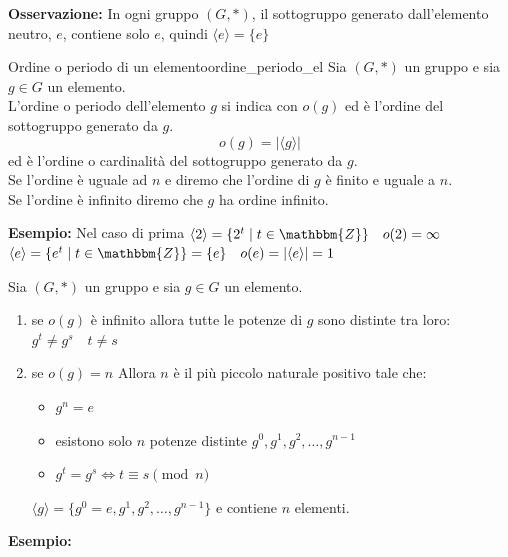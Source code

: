 \documentclass[12pt, letterpaper]{report}
\newcounter{theorem}
\newcounter{definition}
\newcommand{\nmu}{}
\begin{document}
		\textbf{Osservazione:} In ogni gruppo $(G, *)$, il sottogruppo generato dall'elemento neutro, $e$, contiene solo $e$, quindi $\langle e \rangle = \{e\}$
		\begin{definition}{\nmu Ordine o periodo di un elemento}{ordine_periodo_el}
			Sia $(G, *)$ un gruppo e sia $g \in G$ un elemento. \\
			L'ordine o periodo dell'elemento $g$ si indica con $o(g)$ ed è l'ordine del sottogruppo generato da $g$. \\
			\[o(g) = |\langle g \rangle|\]
			ed è l'ordine o cardinalità del sottogruppo generato da $g$. \\
			Se l'ordine è uguale ad $n$ e diremo che l'ordine di $g$ è finito e uguale a $n$. \\
			Se l'ordine è infinito diremo che $g$ ha ordine infinito.
		\end{definition}
		\textbf{Esempio:} Nel caso di prima $\langle2\rangle = \{2^t \mid t \in \mathbbm{Z}\} \quad o(2) = \infty$ \\
		$\langle e \rangle = \{e^t \mid t \in \mathbbm{Z}\} = \{e\} \quad o(e) = |\langle e \rangle| = 1$
		\begin{theorem}{}{}
			Sia $(G, *)$ un gruppo e sia $g \in G$ un elemento.
			\begin{enumerate}
				\item se $o(g)$ è infinito allora tutte le potenze di $g$ sono distinte tra loro: $g^t \neq g^s \quad t \neq s$
				\item se $o(g) = n$ Allora $n$ è il più piccolo naturale positivo tale che:
				\begin{itemize}
					\item $g^n = e$
					\item esistono solo $n$ potenze distinte $g^0, g^1, g^2, \dots, g^{n - 1}$
					\item $g^t = g^s \iff t \equiv s \pmod{n}$
				\end{itemize}
				$\langle g \rangle = \{g^0 = e, g^1, g^2, \dots, g^{n-1}\}$ e contiene $n$ elementi.
			\end{enumerate}
		\end{theorem}
		\textbf{Esempio:}
\end{document}
